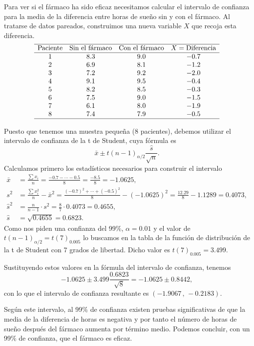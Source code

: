 {Para ver si el fármaco ha sido eficaz necesitamos calcular el intervalo de confianza para la media de la diferencia entre horas de sueño
sin y con el fármaco. Al tratarse de datos pareados, construimos una nueva variable $X$ que recoja esta diferencia.
\[
\begin{array}{cccc}
\hline
\text{Paciente} & \text{Sin el fármaco} & \text{Con el fármaco} & X=\text{Diferencia} \\
\hline 
    1     &        8.3        &         9.0         & -0.7\\
    2     &        6.9        &         8.1         & -1.2\\
    3     &        7.2        &         9.2         & -2.0\\
    4     &        9.1        &         9.5         & -0.4\\
    5     &        8.2        &         8.5         & -0.3\\
    6     &        7.5        &         9.0         & -1.5\\
    7     &        6.1        &         8.0         & -1.9\\
    8     &        7.4        &         7.9         & -0.5\\
\hline
\end{array}
\]

Puesto que tenemos una muestra pequeña (8 pacientes), debemos utilizar el intervalo de confianza de la t de Student, cuya fórmula es
\[
\bar x\pm t(n-1)_{\alpha/2}\frac{\hat s}{\sqrt{n}}.
\]
Calculamos primero los estadísticos necesarios para construir el intervalo
\begin{align*}
\bar x &= \frac{\sum x_{i}}{n}=\frac{-0.7-\cdots -0.5}{8}= \frac{-8.5}{8}=-1.0625,\\
s^2 &= \frac{\sum{x_{i}^2}}{n}-\bar x^2=\frac{(-0.7)^2+\cdots +(-0.5)^2}{8}-(-1.0625)^2= \frac{12.29}{8}-1.1289=0.4073,\\
\hat s^2 &= \frac{n}{n-1}\cdot s^2= \frac{8}{7}\cdot 0.4073 = 0.4655,\\
\hat s &= \sqrt{0.4655}=0.6823.
\end{align*}
Como nos piden una confianza del 99\%, $\alpha=0.01$ y el valor de $t(n-1)_{\alpha/2}=t(7)_{0.005}$ lo buscamos en la tabla de la función de
distribución de la t de Student con 7 grados de libertad. Dicho valor es $t(7)_{0.005}=3.499$.

Sustituyendo estos valores en la fórmula del intervalo de confianza, tenemos
\[
-1.0625\pm 3.499\frac{0.6823}{\sqrt{8}}= -1.0625\pm 0.8442,
\]
con lo que el intervalo de confianza resultante es
$(-1.9067\,,\,-0.2183)$.

Según este intervalo, al 99\% de confianza existen pruebas significativas de que la media de la diferencia de horas es negativa y por tanto
el número de horas de sueño después del fármaco aumenta por término medio. Podemos concluir, con un 99\% de confianza, que el fármaco es
eficaz.
}


